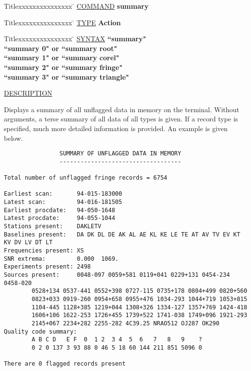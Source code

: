 \begin{tabbing}
Titlexxxxxxxxxxxxxxx \= \kill
\underline{COMMAND} \> {\bf    summary} \\
\end{tabbing}

\begin{tabbing}
Titlexxxxxxxxxxxxxxx \= \kill
\underline{TYPE} \> {\bf            Action} \\
\end{tabbing}

\begin{tabbing}
Titlexxxxxxxxxxxxxxx \= \kill
\underline{SYNTAX} \> {\bf          ``summary"} \\
\> {\bf                 ``summary 0" or ``summary root"} \\
\> {\bf                 ``summary 1" or ``summary corel"} \\
\> {\bf                 ``summary 2" or ``summary fringe"} \\
\> {\bf                 ``summary 3" or ``summary triangle"} \\
\end{tabbing}

\underline{DESCRIPTION}
\begin{list}{}{\setlength{\leftmargin}{0.5in}
     \setlength{\rightmargin}{0in}}
\item
Displays a summary of all unflagged data in memory on
the terminal.  Without arguments, a terse summary of all data of
all types is given.  If a record type is specified, much more
detailed information is provided.  An example is given below.
\item
\begin{verbatim}
                SUMMARY OF UNFLAGGED DATA IN MEMORY
                -----------------------------------

Total number of unflagged fringe records = 6754

Earliest scan:       94-015-183000
Latest scan:         94-016-181505
Earliest procdate:   94-050-1648
Latest procdate:     94-055-1044
Stations present:    DAKLETV
Baselines present:   DA DK DL DE AK AL AE KL KE LE TE AT AV TV EV KT KV DV LV DT LT
Frequencies present: XS
SNR extrema:         0.000  1069.
Experiments present: 2498
Sources present:     0048-097 0059+581 0119+041 0229+131 0454-234 0458-020
        0528+134 0537-441 0552+398 0727-115 0735+178 0804+499 0820+560
        0823+033 0919-260 0954+658 0955+476 1034-293 1044+719 1053+815
        1104-445 1128+385 1219+044 1308+326 1334-127 1357+769 1424-418
        1606+106 1622-253 1726+455 1739+522 1741-038 1749+096 1921-293
        2145+067 2234+282 2255-282 4C39.25 NRAO512 OJ287 OK290
Quality code summary:
        A B C D   E F  0  1 2  3 4  5  6   7   8   9    ?
        0 2 0 137 3 93 88 0 46 5 18 60 144 211 851 5096 0

There are 0 flagged records present
\end{verbatim}
\end{list}
\vspace{.2in}

